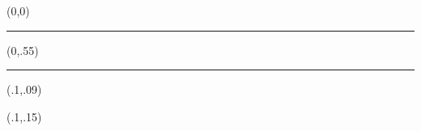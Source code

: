 \documentclass[a4paper]{book}
\begin{document}
\begin{textblock}{1}(0,0)
    \noindent\textcolor{upper}{\rule{\paperwidth}{.55\paperheight}}
\end{textblock}

\begin{textblock}{1}(0,.55)
    \noindent\textcolor{black}{\rule{\paperwidth}{.45\paperheight}}
\end{textblock}

\begin{textblock}{1}(.1,.09)
    \noindent{\fontsize{28}{2}\selectfont
        \bfseries\textcolor{white}{数学之美}}
\end{textblock}

\begin{textblock}{1}(.1,.15)
    \noindent {\fontsize{22}{2}\selectfont
    \bfseries\textcolor{white}{The Beauty of Mathematics}}
\end{textblock}
\end{document}

